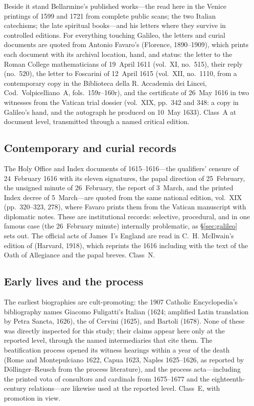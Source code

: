 Beside it stand Bellarmine's published works---the
 read here in
the Venice printings of 1599 and 1721 from complete public scans; the
two Italian catechisms; the late spiritual books---and his letters
where they survive in controlled editions. For everything touching
Galileo, the letters and curial documents are quoted from Antonio
Favaro's 
(Florence, 1890--1909), which prints each document with its archival
location, hand, and status: the letter to the Roman College
mathematicians of 19~April 1611 (vol.~XI, no.~515), their reply
(no.~520), the letter to Foscarini of 12~April 1615 (vol.~XII,
no.~1110, from a contemporary copy in the Biblioteca della R.
Accademia dei Lincei, Cod.\ Volpicelliano~A, fols.\ 159r--160r), and
the certificate of 26~May 1616 in two witnesses from the Vatican
trial dossier (vol.~XIX, pp.~342 and 348: a copy in Galileo's hand,
and the autograph he produced on 10~May 1633). Class~A at document
level, transmitted through a named critical edition.

\subsection{Contemporary and curial records}

The Holy Office and Index documents of 1615--1616---the qualifiers'
censure of 24~February 1616 with its eleven signatures, the papal
direction of 25~February, the unsigned minute of 26~February, the
report of 3~March, and the printed Index decree of 5~March---are
quoted from the same national edition, vol.~XIX (pp.~320--323, 278),
where Favaro prints them from the Vatican manuscript with diplomatic
notes. These are institutional records: selective, procedural, and in
one famous case (the 26~February minute) internally problematic, as
\S\ref{sec:galileo} sets out. The official acts of James~I's England
are read in C.~H. McIlwain's edition of  (Harvard, 1918), which reprints the 1616 
including  with the text of the
Oath of Allegiance and the papal breves. Class~N.

\subsection{Early lives and the process}

The earliest biographies are cult-promoting: the 1907 Catholic
Encyclopedia's bibliography names Giacomo Fuligatti's Italian
 (1624; amplified Latin translation by Petra Sancta,
1626), the  of Cervini (1625), and Bartoli
(1678). None of these was directly inspected for this study; their
claims appear here only at the reported level, through the named
intermediaries that cite them. The beatification process opened its
witness hearings within a year of the death (Rome and Montepulciano
1622, Capua 1623, Naples 1625--1626, as reported by
D\"ollinger--Reusch from the process literature), and the process
acta---including the printed vota of consultors and cardinals from
1675--1677 and the eighteenth-century relations---are likewise used
at the reported level. Class~E, with promotion in view.

